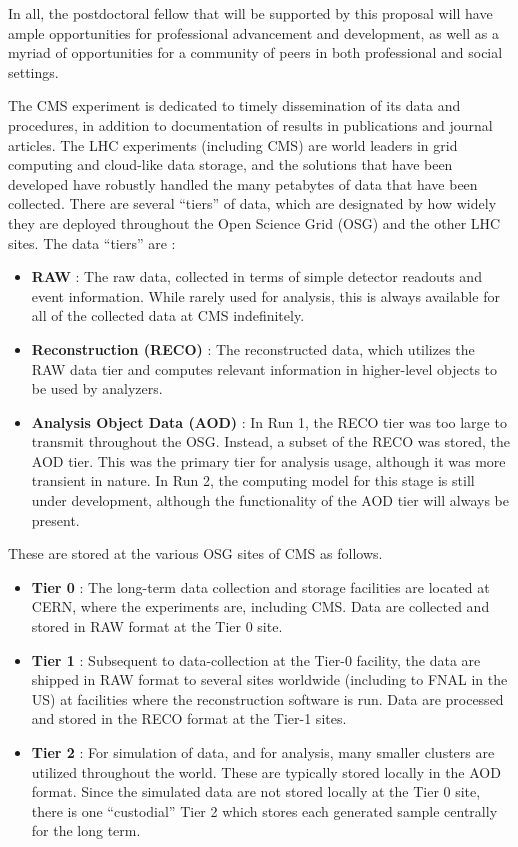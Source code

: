 \documentclass[12pt]{proposalnsf}
\begin{document}
In all, the postdoctoral fellow that will be supported by this
proposal will have ample opportunities for professional advancement
and development, as well as a myriad of opportunities for a community
of peers in both professional and social settings. 



\newpage
{}
\renewcommand{\thepage} {E--\arabic{page}}

The CMS experiment is dedicated to timely dissemination of its data and
procedures, in addition to documentation of results in publications
and journal articles. The LHC experiments (including CMS) are world
leaders in grid computing and cloud-like data storage, and the
solutions that have been developed have robustly handled the many
petabytes of data that have been collected. There are several
``tiers'' of data, which are designated by how widely they are
deployed throughout the Open Science Grid (OSG) and the other LHC
sites. 
The data ``tiers'' are :

\begin{itemize}
\item {\bf RAW} : The raw data, collected in terms of simple detector
  readouts and event information. While rarely used for analysis, this
  is always available for all of the collected data at CMS
  indefinitely. 
\item {\bf Reconstruction (RECO)} : The reconstructed data, which
  utilizes the RAW data tier and computes relevant information in
  higher-level objects to be used by analyzers. 
\item {\bf Analysis Object Data (AOD)} : In Run 1, the RECO tier was
  too large to transmit throughout the OSG. Instead, a subset of the
  RECO was stored, the AOD tier. This was the primary tier for
  analysis usage, although it was more transient in nature. In Run 2,
  the computing model for this stage is still under development,
  although the functionality of the AOD tier will always be present.
\end{itemize}

These are stored at the various OSG sites of CMS as follows. 
\begin{itemize}
\item {\bf Tier 0} : The long-term data collection and storage
  facilities are located at CERN, where the experiments are, including
  CMS. Data are collected and stored in RAW format at the Tier 0 site. 
\item {\bf Tier 1} : Subsequent to data-collection at the Tier-0
  facility, the data are shipped in RAW format to several sites
  worldwide (including to FNAL in the US) at facilities where the
  reconstruction software is run. Data are processed and stored in the
  RECO format at the Tier-1 sites. 
\item {\bf Tier 2} : For simulation of data, and for analysis, many
  smaller clusters are utilized throughout the world. These are
  typically stored locally in the AOD format. Since the simulated data
  are not stored locally at the Tier 0 site, there is one
  ``custodial'' Tier 2 which stores each generated sample centrally
  for the long term. 
\end{itemize}
\end{document}
